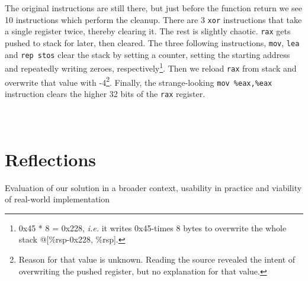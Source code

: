 \documentclass[a4paper,10pt,openright]{memoir}
\newcommand{\ie}{\emph{i.e.}\xspace}
\newcommand{\code}[1]{\texttt{#1}}
\begin{document}
The original instructions are still there, but just before the function 
return we see 10 instructions which perform the cleanup. There are 3 
\code{xor} instructions that take a single register twice, thereby 
clearing it. The rest is slightly chaotic. \code{rax} gets pushed to 
stack for later, then cleared. The three following instructions, 
\code{mov}, \code{lea} and \code{rep stos} clear the stack by setting a 
counter, setting the starting address and repeatedly writing zeroes, 
respectively\footnote{0x45 * 8 = 0x228, \ie it writes 0x45-times 8 
bytes to overwrite the whole stack @[\%rsp-0x228, \%rsp].}. Then we 
reload \code{rax} from stack and overwrite that value with 
-4\footnote{Reason for that value is unknown. Reading the source 
revealed the intent of overwriting the pushed register, but no 
explanation for that value.}. Finally, the strange-looking \code{mov 
\%eax,\%eax} instruction clears the higher 32 bits of the \code{rax} 
register.



\begin{verbatim}
\end{verbatim}


\begin{verbatim}
\end{verbatim}
\begin{verbatim}
\end{verbatim}





\chapter{Reflections}

Evaluation of our solution in a broader context, usability in practice 
and viability of real-world implementation

\end{document}
